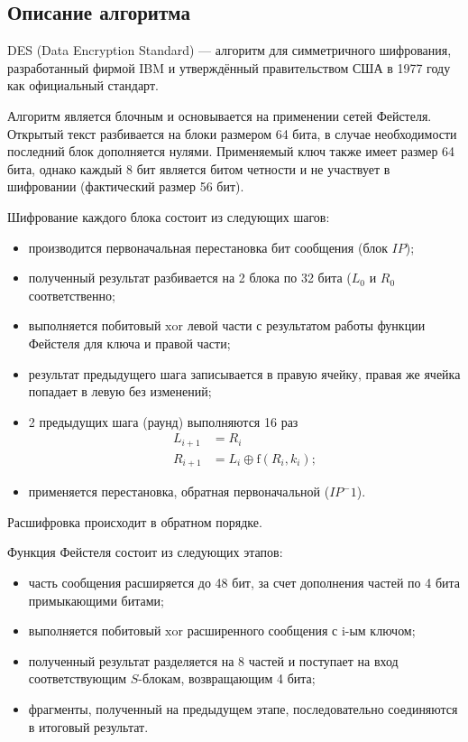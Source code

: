 
\vspace{-1\baselineskip}

\subsection{Описание алгоритма}

DES (Data Encryption Standard) --- алгоритм для симметричного шифрования,
разработанный фирмой IBM и утверждённый правительством США в 1977 году как
официальный стандарт.

Алгоритм является блочным и основывается на применении сетей Фейстеля.
Открытый текст разбивается на блоки размером 64 бита, в случае необходимости
последний блок дополняется нулями. Применяемый ключ также имеет размер 64
бита, однако каждый 8 бит является битом четности и не участвует в шифровании
(фактический размер 56 бит).

Шифрование каждого блока состоит из следующих шагов:
\begin{itemize}
    \item производится первоначальная перестановка бит сообщения (блок $IP$);
    \item полученный результат разбивается на 2 блока по 32 бита ($L_0$ и $R_0$
          соответственно;
    \item выполняется побитовый $\mathrm{xor}$ левой части с результатом работы
          функции Фейстеля для ключа и правой части;
    \item результат предыдущего шага записывается в правую ячейку, правая же
          ячейка попадает в левую без изменений;
    \item 2 предыдущих шага (раунд) выполняются 16 раз
    \begin{align*}
        L_{i+1} & = R_i \\
        R_{i+1} & = L_i \oplus \mathrm{f}(R_i, k_i);
    \end{align*}
    \item применяется перестановка, обратная первоначальной ($IP^-1$).
\end{itemize}
Расшифровка происходит в обратном порядке.

Функция Фейстеля состоит из следующих этапов:
\begin{itemize}
    \item часть сообщения расширяется до 48 бит, за счет дополнения частей
          по 4 бита примыкающими битами;
    \item выполняется побитовый $\mathrm{xor}$ расширенного сообщения с
          i-ым ключом;
    \item полученный результат разделяется на 8 частей и поступает на вход
          соответствующим $S$-блокам, возвращающим 4 бита;
    \item фрагменты, полученный на предыдущем этапе, последовательно
          соединяются в итоговый результат.
\end{itemize}

